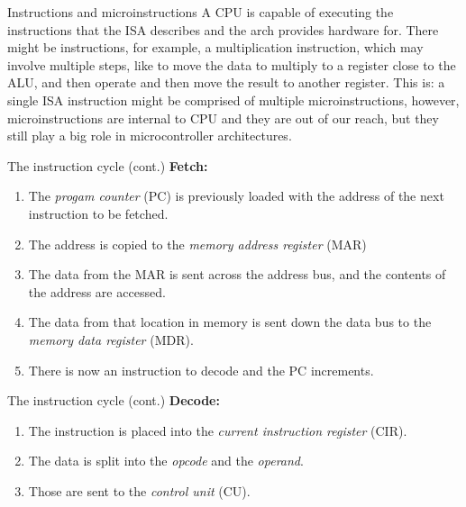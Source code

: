 \documentclass[aspectratio=169]{beamer}
\begin{document}
\begin{frame}{Instructions and microinstructions}
  A CPU is capable of executing the instructions that the ISA describes and the \textmu arch provides hardware for. 
  There might be instructions, for example, a multiplication instruction, which may involve multiple steps, like to move the data to multiply to a register close to the ALU, and then operate and then move the result to another register. This is: a single ISA instruction might be comprised of multiple microinstructions, however, microinstructions are internal to CPU and they are out of our reach, but they still play a big role in microcontroller architectures.
\end{frame}

\begin{frame}{The instruction cycle (cont.)}
  \textbf{\large Fetch:}
  \begin{enumerate}
    \item <2-> The \textit{progam counter} (PC) is previously loaded with the address of the next instruction to be fetched.
    \item <3-> The address is copied to the \textit{memory address register} (MAR)
    \item <4-> The data from the MAR is sent across the address bus, and the contents of the address are accessed.
    \item <5-> The data from that location in memory is sent down the data bus to the \textit{memory data register} (MDR). 
    \item <6-> There is now an instruction to decode and the PC increments.
  \end{enumerate}
\end{frame}

\begin{frame}{The instruction cycle (cont.)}
  \textbf{\large Decode:}
  \begin{enumerate}
        \item <2-> The instruction is placed into the \textit{current instruction register} (CIR).
        \item <3-> The data is split into the \textit{opcode} and the \textit{operand}.
        \item <4-> Those are sent to the \textit{control unit} (CU).
  \end{enumerate}
\end{frame}
\end{document}
